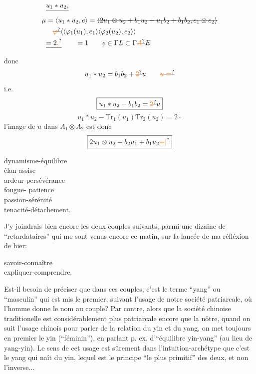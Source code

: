 \[
\begin{aligned}
&\deleted{u_1\ast u_2,}\\
\mu&=\langle u_1\ast u_2,e\rangle
 =\deleted{\langle 2u_1\otimes u_2+b_1u_2+u_1b_2+b_1b_2,e_1\otimes e_2\rangle}\\
&\quad \deleted{\unsure{\varphi}}\inserted{\langle\varphi_1(u_1),e_1\rangle
 \langle\varphi_2(u_2),e_2\rangle}\\
&\deleted{=2\unsure{,}}\qquad=1\qquad e\in\Gamma L\subset\Gamma\deleted{\unsure{A}}E
\end{aligned}
\]
donc
\[
u_1\ast u_2=b_1b_2+\deleted{\unsure{2}}u
\qquad\deleted{\unsure{u=}}
\]
i.e.
\[
\boxed{u_1\ast u_2-b_1b_2=\deleted{\unsure{2}}u}
\]
\[
u_1\ast u_2-\mathrm{Tr}_1(u_1)\mathrm{Tr}_2(u_2)=2\cdot
\]
l'image de $u$ dans $A_1\otimes A_2$ est donc
\[
\boxed{2u_1\otimes u_2+b_2u_1+b_1u_2\unsure{+|{}}}
\]

\begin{flushleft}
dynamisme-équilibre\\
élan-assise\\
ardeur-persévérance\\
fougue- patience\\
passion-sérénité\\
tenacité-détachement.
\end{flushleft}

J'y joindrais bien encore les deux couples suivants, parmi une dizaine de ``retardataires'' qui me sont venus encore ce matin, sur la lancée de ma réfléxion de hier:

\begin{flushleft}
savoir-connaître\\
expliquer-comprendre.
\end{flushleft}

Est-il besoin de préciser que dans ces couples, c'est le terme ``yang'' ou ``masculin'' qui est mis le premier, suivant l'usage de notre société patriarcale, où l'homme donne le nom au couple? Par contre, alors que la société chinoise traditionelle est considérablement plus patriarcale encore que la nôtre, quand on suit l'usage chinois pour parler de la relation du yin et du yang, on met toujours en premier le yin (``féminin''), en parlant p. ex. d'``équilibre yin-yang'' (au lieu de yang-yin). Le sens de cet usage est sûrement dans l'intuition-archétype que c'est le yang qui naît du yin, lequel est le principe ``le plus primitif'' des deux, et non l'inverse...

